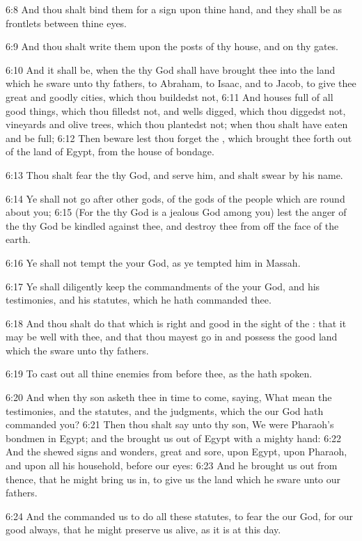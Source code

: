 6:8 And thou shalt bind them for a sign upon thine hand, and they
shall be as frontlets between thine eyes.

6:9 And thou shalt write them upon the posts of thy house, and on thy
gates.

6:10 And it shall be, when the \LORD thy God shall have brought thee
into the land which he sware unto thy fathers, to Abraham, to Isaac,
and to Jacob, to give thee great and goodly cities, which thou
buildedst not, 6:11 And houses full of all good things, which thou
filledst not, and wells digged, which thou diggedst not, vineyards and
olive trees, which thou plantedst not; when thou shalt have eaten and
be full; 6:12 Then beware lest thou forget the \LORD, which brought
thee forth out of the land of Egypt, from the house of bondage.

6:13 Thou shalt fear the \LORD thy God, and serve him, and shalt swear
by his name.

6:14 Ye shall not go after other gods, of the gods of the people which
are round about you; 6:15 (For the \LORD thy God is a jealous God among
you) lest the anger of the \LORD thy God be kindled against thee, and
destroy thee from off the face of the earth.

6:16 Ye shall not tempt the \LORD your God, as ye tempted him in
Massah.

6:17 Ye shall diligently keep the commandments of the \LORD your God,
and his testimonies, and his statutes, which he hath commanded thee.

6:18 And thou shalt do that which is right and good in the sight of
the \LORD: that it may be well with thee, and that thou mayest go in
and possess the good land which the \LORD sware unto thy fathers.

6:19 To cast out all thine enemies from before thee, as the \LORD hath
spoken.

6:20 And when thy son asketh thee in time to come, saying, What mean
the testimonies, and the statutes, and the judgments, which the \LORD
our God hath commanded you?  6:21 Then thou shalt say unto thy son, We
were Pharaoh's bondmen in Egypt; and the \LORD brought us out of Egypt
with a mighty hand: 6:22 And the \LORD shewed signs and wonders, great
and sore, upon Egypt, upon Pharaoh, and upon all his household, before
our eyes: 6:23 And he brought us out from thence, that he might bring
us in, to give us the land which he sware unto our fathers.

6:24 And the \LORD commanded us to do all these statutes, to fear the
\LORD our God, for our good always, that he might preserve us alive, as
it is at this day.

